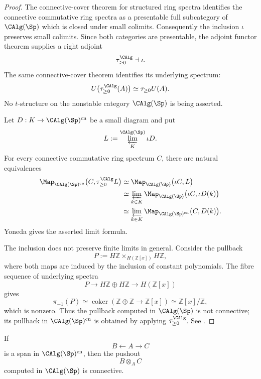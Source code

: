 \begin{proof}
The connective-cover theorem for structured ring spectra identifies the
connective commutative ring spectra as a presentable full subcategory of
$\CAlg(\Sp)$ which is closed under small colimits. Consequently the
inclusion $\iota$ preserves small colimits. Since both categories are
presentable, the adjoint functor theorem supplies a right adjoint
\[
    \tau_{\geq0}^{\CAlg}
    \dashv
    \iota.
\]
The same connective-cover theorem identifies its underlying spectrum:
\[
    U\bigl(\tau_{\geq0}^{\CAlg}(A)\bigr)
    \simeq
    \tau_{\geq0}U(A).
\]
No $t$-structure on the nonstable category $\CAlg(\Sp)$ is being
asserted.

Let $D:K\to\CAlg(\Sp)^{\mathrm{cn}}$ be a small diagram and put
\[
    L
    :=
    \varprojlim_K^{\CAlg(\Sp)}
    \iota D.
\]
For every connective commutative ring spectrum $C$, there are natural
equivalences
\[
\begin{aligned}
    \Map_{\CAlg(\Sp)^{\mathrm{cn}}}
    \bigl(
        C,
        \tau_{\geq0}^{\CAlg}L
    \bigr)
    &\simeq
    \Map_{\CAlg(\Sp)}
    \bigl(
        \iota C,
        L
    \bigr)
    \\
    &\simeq
    \varprojlim_{k\in K}
    \Map_{\CAlg(\Sp)}
    \bigl(
        \iota C,
        \iota D(k)
    \bigr)
    \\
    &\simeq
    \varprojlim_{k\in K}
    \Map_{\CAlg(\Sp)^{\mathrm{cn}}}
    \bigl(
        C,
        D(k)
    \bigr).
\end{aligned}
\]
Yoneda gives the asserted limit formula.

The inclusion does not preserve finite limits in general. Consider the
pullback
\[
    P
    :=
    H\mathbb Z
    \times_{H(\mathbb Z[x])}
    H\mathbb Z,
\]
where both maps are induced by the inclusion of constant polynomials.
The fibre sequence of underlying spectra
\[
    P
    \longrightarrow
    H\mathbb Z\oplus H\mathbb Z
    \longrightarrow
    H(\mathbb Z[x])
\]
gives
\[
    \pi_{-1}(P)
    \simeq
    \operatorname{coker}
    \left(
        \mathbb Z\oplus\mathbb Z
        \longrightarrow
        \mathbb Z[x]
    \right)
    \simeq
    \mathbb Z[x]/\mathbb Z,
\]
which is nonzero. Thus the pullback computed in $\CAlg(\Sp)$ is not
connective; its pullback in $\CAlg(\Sp)^{\mathrm{cn}}$ is obtained by
applying $\tau_{\geq0}^{\CAlg}$.
See \cite{LurieHigherAlgebra,LurieSAG}.
\end{proof}

\begin{corollary}
\label{cor:connective-calg-pushouts}
If
\[
    B
    \longleftarrow
    A
    \longrightarrow
    C
\]
is a span in $\CAlg(\Sp)^{\mathrm{cn}}$, then the pushout
\[
    B\otimes_A C
\]
computed in $\CAlg(\Sp)$ is connective.
\end{corollary}

